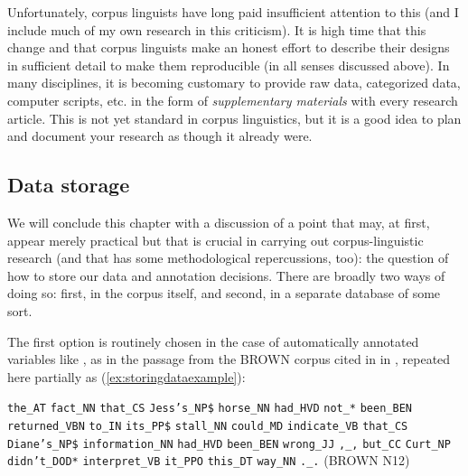 Unfortunately, corpus linguists have long paid insufficient attention to this (and I include much of my own research in this criticism). It is high time that this change and that corpus linguists make an honest effort to describe their designs  in sufficient detail to make them reproducible  (in all senses discussed above). In many disciplines, it is becoming customary to provide raw data, categorized  data, computer scripts, etc. in the form of \textit{supplementary materials} with every research article. This is not yet standard in corpus linguistics, but it is a good idea to plan and document your research as though it already were.

\subsection{Data storage}
\label{sec:datastorage}

We will conclude this chapter with a discussion of a point that may, at first, appear merely practical but that is crucial in carrying out corpus\hyp{}linguistic research (and that has some methodological repercussions, too): the question of how to store  our data and annotation  decisions. There are broadly two ways of doing so: first, in the corpus itself, and second, in a separate database of some sort.

The first option is routinely chosen in the case of automatically annotated variables like , as in the passage from the BROWN  corpus cited in  in , repeated here partially as (\ref{ex:storingdataexample}):

\begin{exe}
\ex \begin{minipage}[t]{0.85\textwidth} \raggedright \texttt{the\_AT} \texttt{fact\_NN} \texttt{that\_CS} \texttt{Jess's\_NP\$} \texttt{horse\_NN} \texttt{had\_HVD} \texttt{not\_*} \texttt{been\_BEN} \texttt{returned\_VBN} \texttt{to\_IN} \texttt{its\_PP\$} \texttt{stall\_NN} \texttt{could\_MD} \texttt{indicate\_VB} \texttt{that\_CS} \texttt{Diane's\_NP\$} \texttt{information\_NN} \texttt{had\_HVD} \texttt{been\_BEN} \texttt{wrong\_JJ} \texttt{,\_,} \texttt{but\_CC} \texttt{Curt\_NP} \texttt{didn't\_DOD*} \texttt{interpret\_VB} \texttt{it\_PPO} \texttt{this\_DT} \texttt{way\_NN} \texttt{.\_.} (BROWN N12) \end{minipage}
\label{ex:storingdataexample}
\end{exe}

